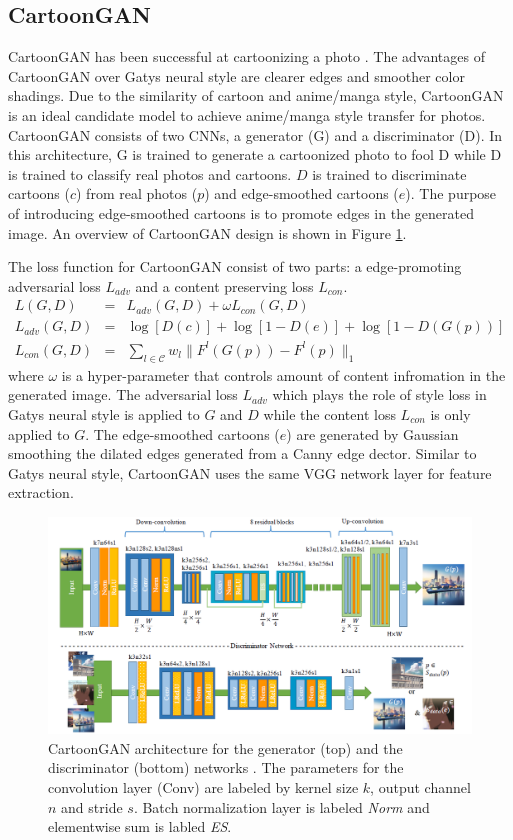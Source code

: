\documentclass{article}
\begin{document}
\subsection{CartoonGAN}
CartoonGAN has been successful at cartoonizing a photo \cite{CartoonGAN}. The advantages of CartoonGAN over Gatys neural style are clearer edges and smoother color shadings. Due to the similarity of cartoon and anime/manga style, CartoonGAN is an ideal candidate model to achieve anime/manga style transfer for photos. CartoonGAN consists of two CNNs, a generator (G) and a discriminator (D). In this architecture, G is trained to generate a cartoonized photo to fool D while D is trained to classify real photos and cartoons. $D$ is trained to discriminate cartoons ($c$) from real photos ($p$) and edge-smoothed cartoons ($e$). The purpose of introducing edge-smoothed cartoons is to promote edges in the generated image. An overview of CartoonGAN design is shown in Figure \ref{fig:architecture}.

The loss function for CartoonGAN consist of two parts: a edge-promoting adversarial loss $L_{adv}$ and a content preserving loss $L_{con}$.
\begin{eqnarray}
  L(G,D) &=& L_{adv}(G,D) + \omega L_{con}(G,D)\\
  L_{adv}(G, D) &=& \log[D(c)] + \log[1-D(e)] + \log[1-D(G(p))]\\
  L_{con}(G, D) &=& \sum_{l\in \mathcal{C}} w_l\| F^{l}(G(p)) - F^{l}(p) \|_1
\end{eqnarray}
where $\omega$ is a hyper-parameter that controls amount of content infromation in the generated image. The adversarial loss $L_{adv}$ which plays the role of style loss in Gatys neural style is applied to $G$ and $D$ while the content loss $L_{con}$ is only applied to $G$. The edge-smoothed cartoons ($e$) are generated by Gaussian smoothing the dilated edges generated from a Canny edge dector. Similar to Gatys neural style, CartoonGAN uses the same VGG network layer for feature extraction.

\begin{figure}[b]
  \centering
  \includegraphics[width=\textwidth, height=0.2\textheight]{figure/CartoonGAN.png}
  \caption{CartoonGAN architecture for the generator (top) and the discriminator (bottom) networks \cite{CartoonGAN}. The parameters for the convolution layer (Conv) are labeled by kernel size $k$, output channel $n$ and stride $s$. Batch normalization layer is labeled \textit{Norm} and elementwise sum is labled \textit{ES}.}
  \label{fig:architecture}
\end{figure}
\end{document}
